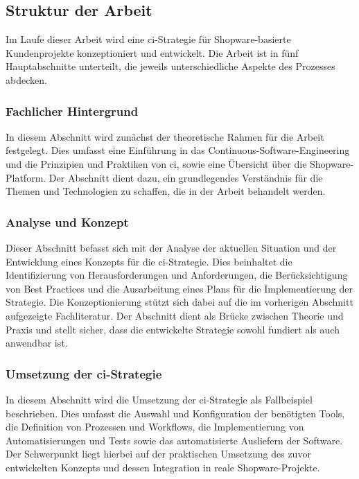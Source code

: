 \subsection{Struktur der Arbeit} \label{subsec:01-introduction-3}

Im Laufe dieser Arbeit wird eine \acrshort{ci}-Strategie für Shopware-basierte Kundenprojekte konzeptioniert und
entwickelt.
Die Arbeit ist in fünf Hauptabschnitte unterteilt, die jeweils unterschiedliche Aspekte des Prozesses abdecken.

\subsubsection{Fachlicher Hintergrund}

In diesem Abschnitt wird zunächst der theoretische Rahmen für die Arbeit festgelegt.
Dies umfasst eine Einführung in das Continuous-Software-Engineering und die Prinzipien und Praktiken von
\acrlong{ci}, sowie eine Übersicht über die Shopware-Platform.
Der Abschnitt dient dazu, ein grundlegendes Verständnis für die Themen und Technologien zu schaffen, die in
der Arbeit behandelt werden.

\subsubsection{Analyse und Konzept}

Dieser Abschnitt befasst sich mit der Analyse der aktuellen Situation und der Entwicklung eines Konzepts für die
\acrshort{ci}-Strategie.
Dies beinhaltet die Identifizierung von Herausforderungen und Anforderungen, die Berücksichtigung von Best
Practices und die Ausarbeitung eines Plans für die Implementierung der Strategie.
Die Konzeptionierung stützt sich dabei auf die im vorherigen Abschnitt aufgezeigte Fachliteratur.
Der Abschnitt dient als Brücke zwischen Theorie und Praxis und stellt sicher, dass die entwickelte Strategie sowohl
fundiert als auch anwendbar ist.

\subsubsection{Umsetzung der \acrshort{ci}-Strategie}

In diesem Abschnitt wird die Umsetzung der \acrshort{ci}-Strategie als Fallbeispiel beschrieben.
Dies umfasst die Auswahl und Konfiguration der benötigten Tools, die Definition von Prozessen und Workflows,
die Implementierung von Automatisierungen und Tests sowie das automatisierte Ausliefern der Software.
Der Schwerpunkt liegt hierbei auf der praktischen Umsetzung des zuvor entwickelten Konzepts und dessen Integration in
reale Shopware-Projekte.

